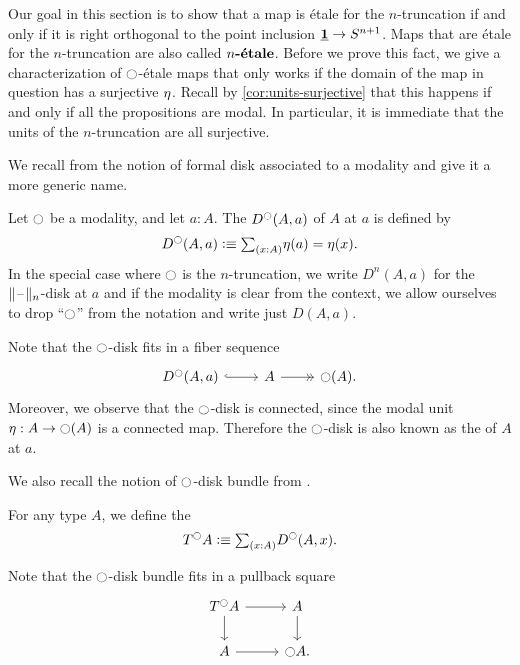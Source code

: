 \documentclass[9pt,twosided]{amsart}
\begin{document}
Our goal in this section is to show that a map is \'etale for the $n$-truncation if and only if it is right orthogonal to the point inclusion $\underline{\mathbf{1}}\to S^{n+1}$. Maps that are \'etale for the $n$-truncation are also called $\textbf{$n$-\'etale}$.
Before we prove this fact, we give a characterization of ${\ocircle}$-\'etale maps that only works if the domain of the map in question has a surjective ${\eta_{}}$. Recall by \cref{cor:units-surjective} that this happens if and only if all the propositions are modal. In particular, it is immediate that the units of the $n$-truncation are all surjective.

We recall from \cite{wellen-thesis} the notion of formal disk associated to a modality and give it a more generic name.

\begin{defn}
  Let ${\ocircle}$ be a modality, and let $a:A$. The  $D^{{\ocircle}}(A,a)$ of $A$ at $a$ is defined by
  \begin{equation*}
    D^\modal(A,a)\defeq \sm{x:A}\eta(a)=\eta(x).
  \end{equation*}
  In the special case where ${\ocircle}$ is the $n$-truncation, we write $D^n(A,a)$ for the $\trunc{n}{\blank}$-disk at $a$ and if the modality is clear from the context, we allow ourselves to drop ``${\ocircle}$'' from the notation and write just $D(A,a)$.
\end{defn}

Note that the ${\ocircle}$-disk fits in a fiber sequence
\begin{equation*}
  \begin{tikzcd}
    D^\modal(A,a) \arrow[r,hook] & A \arrow[r,->>] & \modal(A).
  \end{tikzcd}
\end{equation*}
Moreover, we observe that the ${\ocircle}$-disk is connected, since the modal unit $\eta:A\to{\ensuremath{\ocircle}}(A)$ is a connected map. Therefore the ${\ocircle}$-disk is also known as the  of $A$ at $a$.

We also recall the notion of ${\ocircle}$-disk bundle from \cite{wellen-thesis}.

\begin{defn}
  For any type $A$, we define the 
  \begin{equation*}
    T^\modal A \defeq \sm{x:A}D^\modal(A,x).
  \end{equation*}
\end{defn}

Note that the ${\ocircle}$-disk bundle fits in a pullback square
\begin{equation*}
  \begin{tikzcd}
    T^\modal A \arrow[r] \arrow[d] & A \arrow[d] \\
    A \arrow[r] & \modal A.
  \end{tikzcd}
\end{equation*}
\end{document}
